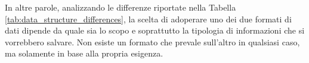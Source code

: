 In altre parole, analizzando le differenze riportate nella Tabella  \ref{tab:data_structure_differences}, la scelta di adoperare uno dei due formati di dati dipende da quale sia lo scopo e soprattutto la tipologia di informazioni che si vorrebbero salvare. Non esiste un formato che prevale sull’altro in qualsiasi caso, ma solamente in base alla propria esigenza.

